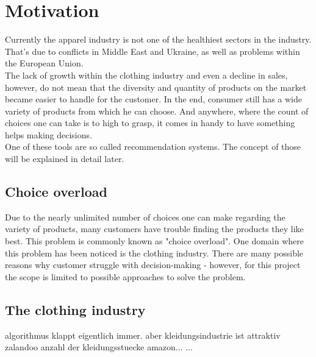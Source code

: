 

\section{Motivation}
Currently the apparel industry is not one of the healthiest sectors in the industry.
That's due to conflicts in Middle East and Ukraine, as well as problems within the European Union.\citep[p. 4]{alten:14}\\
The lack of growth within the clothing industry and even a decline in sales, however, do not mean that the diversity and quantity of products on the market became easier to handle for the customer.
In the end, consumer still has a wide variety of products from which he can choose.
And anywhere, where the count of choices one can take is to high to grasp, it comes in handy to have something helps making decisions.\\
One of these tools are so called recommendation systems. The concept of those will be explained in detail later.


\subsection{Choice overload}
Due to the nearly unlimited number of choices one can make regarding the variety of products, many customers have trouble finding the products they like best.
This problem is commonly known as "choice overload".\citep[p. 454]{stanton:12}
One domain where this problem has been noticed is the clothing industry.
There are many possible reasons why customer struggle with decision-making\citep[p. 454]{stanton:12} - however, for this project the scope is limited to possible approaches to solve the problem.



\subsection{The clothing industry}
algorithmus klappt eigentlich immer.
aber kleidungsindustrie ist attraktiv
zalandoo anzahl der kleidungsstuecke
amazon...
...






